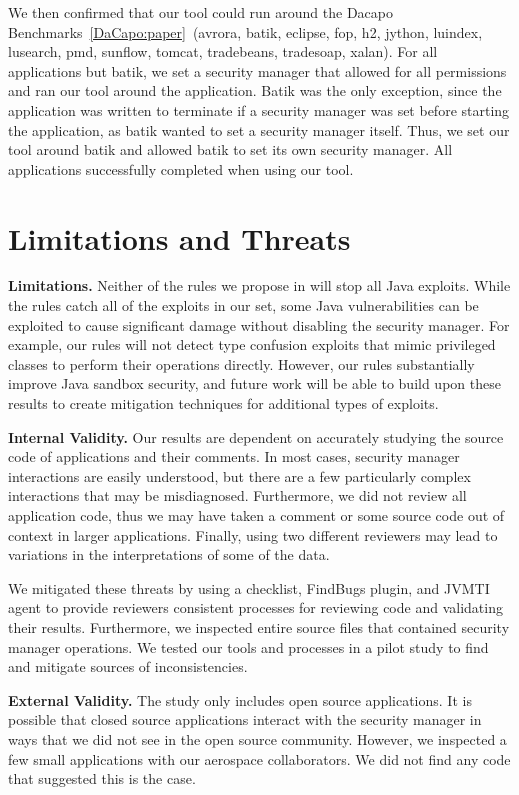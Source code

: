 \documentclass{sig-alternate}
\newcommand{\minisec}[1]{\vspace{2ex}\noindent\textbf{#1}}
\begin{document}
We then confirmed that our tool could run around the Dacapo Benchmarks~\ref{DaCapo:paper}~(avrora, batik, eclipse, fop, h2, jython, luindex, lusearch, pmd, sunflow, tomcat, tradebeans, tradesoap, xalan).  For all applications but batik, we set a security manager that allowed for all permissions and ran our tool around the application.  Batik was the only exception, since the application was written to terminate if a security manager was set before starting the application, as batik wanted to set a security manager itself.  Thus, we set our tool around batik and allowed batik to set its own security manager.  All applications successfully completed when using our tool.

\section{Limitations and Threats}

\minisec{Limitations.}
Neither of the rules we propose in  will stop all Java exploits. While the rules
catch all of the exploits in our set, some Java vulnerabilities can
be exploited to cause significant damage without disabling the security
manager. For example, our rules will not detect type confusion exploits
that mimic privileged classes to perform their operations directly.
However, our rules substantially improve Java sandbox security, and
future work will be able to build upon these results to create mitigation
techniques for additional types of exploits.

\minisec{Internal Validity.} 
Our results are dependent on accurately studying the source code of
applications and their comments. In most cases, security manager interactions
are easily understood, but there are a few particularly complex interactions
that may be misdiagnosed. Furthermore, we did not review all application
code, thus we may have taken a comment or some source code out of
context in larger applications. Finally, using two different reviewers
may lead to variations in the interpretations of some of the data. 

We mitigated these threats by using a checklist, FindBugs plugin, and JVMTI agent to
provide reviewers consistent processes for reviewing code
and validating their results. Furthermore,
we inspected entire source files that contained
security manager operations. We tested our tools and processes in a pilot study
to find and mitigate sources of inconsistencies.

\minisec{External Validity.}
The study only includes open source applications. It is possible
that closed source applications interact with the security manager
in ways that we did not see in the open source community. However,
we inspected a few small applications with our aerospace collaborators.
We did not find any code that suggested this is the case. 
\end{document}
